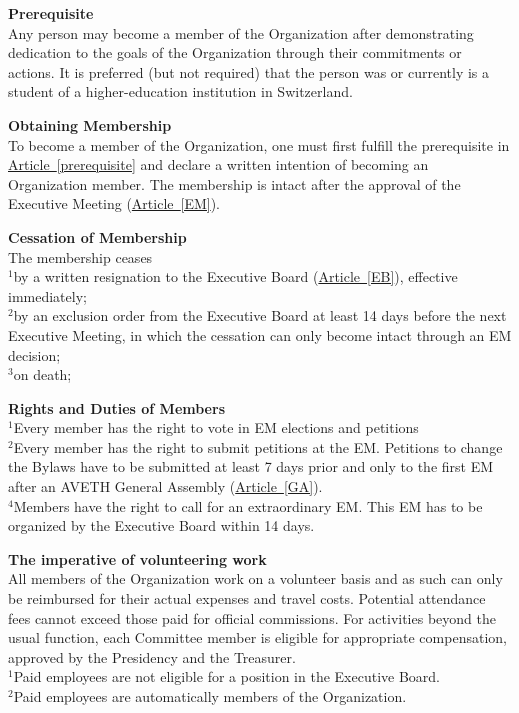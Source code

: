 \documentclass[10pt]{article}
\newcounter{qcounter}
\begin{document}
\begin{list}{{\bf Article :~}}{}
\item {\bf Prerequisite}\label{prerequisite}\\
Any person may become a member of the Organization after demonstrating dedication to the goals of the Organization through their commitments or actions. It is preferred (but not required) that the person was or currently is a student of a higher-education institution in Switzerland.

\item {\bf Obtaining Membership}\\
To become a member of the Organization, one must first fulfill the prerequisite in \hyperref[prerequisite]{Article~\ref{prerequisite}} and declare a written intention of becoming an Organization member. The membership is intact after the approval of the Executive Meeting (\hyperref[EM]{Article~\ref{EM}}).

\item {\bf Cessation of Membership}\\ \label{cessation}
The membership ceases\\ 
$^{1}$by a written resignation to the Executive Board (\hyperref[EB]{Article~\ref{EB}}), effective immediately;\\
$^{2}$by an exclusion order from the Executive Board at least 14 days before the next Executive Meeting, in which the cessation can only become intact through an EM decision;\\
$^{3}$on death;

\item {\bf Rights and Duties of Members}\label{Duties}\\
$^{1}$Every member has the right to vote in EM elections and petitions\\
$^{2}$Every member has the right to submit petitions at the EM. Petitions to change the Bylaws have to be submitted at least 7 days prior and only to the first EM after an AVETH General Assembly (\hyperref[GA]{Article~\ref{GA}}).\\
$^{4}$Members have the right to call for an extraordinary EM. This EM has to be organized by the Executive Board within 14 days.\\

\item {\bf The imperative of volunteering work}\\
All members of the Organization work on a volunteer basis and as such can only be reimbursed for their actual expenses and travel costs. Potential attendance fees cannot exceed those paid for official commissions. For activities beyond the usual function, each Committee member is eligible for appropriate compensation, approved by the Presidency and the Treasurer. \\
$^{1}$Paid employees are not eligible for a position in the Executive Board.\\
$^{2}$Paid employees are automatically members of the Organization.


\end{list}
\end{document}
